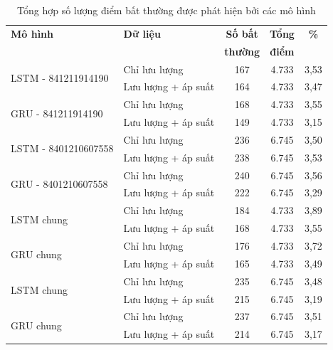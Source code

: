 \begin{table}[htbp]
    \centering
    \begin{tabular}{|l|l|c|c|c|}
        \hline
        \textbf{Mô hình} & \textbf{Dữ liệu} & \textbf{Số bất} & \textbf{Tổng} & \textbf{\%} \\
        & & \textbf{thường} & \textbf{điểm} & \\
        \hline
        \multirow{2}{*}{LSTM - 841211914190} & Chỉ lưu lượng & 167 & 4.733 & 3,53 \\
        \cline{2-5}
        & Lưu lượng + áp suất & 164 & 4.733 & 3,47 \\
        \hline
        \multirow{2}{*}{GRU - 841211914190} & Chỉ lưu lượng & 168 & 4.733 & 3,55 \\
        \cline{2-5}
        & Lưu lượng + áp suất & 149 & 4.733 & 3,15 \\
        \hline
        \multirow{2}{*}{LSTM - 8401210607558} & Chỉ lưu lượng & 236 & 6.745 & 3,50 \\
        \cline{2-5}
        & Lưu lượng + áp suất & 238 & 6.745 & 3,53 \\
        \hline
        \multirow{2}{*}{GRU - 8401210607558} & Chỉ lưu lượng & 240 & 6.745 & 3,56 \\
        \cline{2-5}
        & Lưu lượng + áp suất & 222 & 6.745 & 3,29 \\
        \hline
        \multirow{2}{*}{LSTM chung} & Chỉ lưu lượng & 184 & 4.733 & 3,89 \\
        \cline{2-5}
        (841211914190) & Lưu lượng + áp suất & 168 & 4.733 & 3,55 \\
        \hline
        \multirow{2}{*}{GRU chung} & Chỉ lưu lượng & 176 & 4.733 & 3,72 \\
        \cline{2-5}
        (841211914190) & Lưu lượng + áp suất & 165 & 4.733 & 3,49 \\
        \hline
        \multirow{2}{*}{LSTM chung} & Chỉ lưu lượng & 235 & 6.745 & 3,48 \\
        \cline{2-5}
        (8401210607558) & Lưu lượng + áp suất & 215 & 6.745 & 3,19 \\
        \hline
        \multirow{2}{*}{GRU chung} & Chỉ lưu lượng & 237 & 6.745 & 3,51 \\
        \cline{2-5}
        (8401210607558) & Lưu lượng + áp suất & 214 & 6.745 & 3,17 \\
        \hline
    \end{tabular}
    \caption{Tổng hợp số lượng điểm bất thường được phát hiện bởi các mô hình}
    \label{tab:anomaly_detection_summary}
\end{table}

